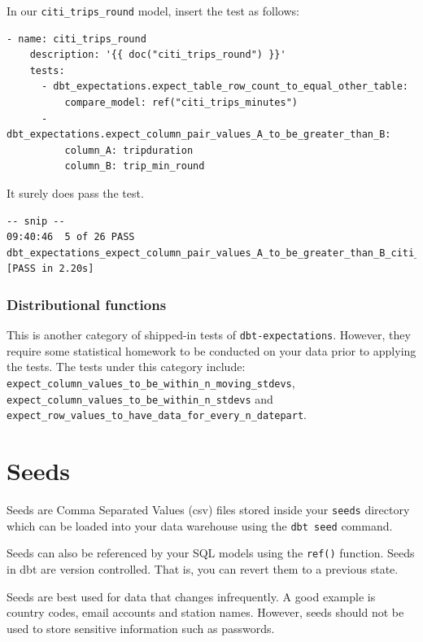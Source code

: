 \documentclass[
]{book}
\begin{document}
In our \texttt{citi\_trips\_round} model, insert the test as follows:

\begin{verbatim}
- name: citi_trips_round
    description: '{{ doc("citi_trips_round") }}'
    tests:
      - dbt_expectations.expect_table_row_count_to_equal_other_table:
          compare_model: ref("citi_trips_minutes")
      - dbt_expectations.expect_column_pair_values_A_to_be_greater_than_B:
          column_A: tripduration
          column_B: trip_min_round
\end{verbatim}

It surely does pass the test.

\begin{verbatim}
-- snip --
09:40:46  5 of 26 PASS dbt_expectations_expect_column_pair_values_A_to_be_greater_than_B_citi_trips_round_tripduration__trip_min_round  [PASS in 2.20s]
\end{verbatim}

\hypertarget{distributional-functions}{%
\subsection{Distributional functions}\label{distributional-functions}}

This is another category of shipped-in tests of \texttt{dbt-expectations}. However, they require some statistical homework to be conducted on your data prior to applying the tests. The tests under this category include: \texttt{expect\_column\_values\_to\_be\_within\_n\_moving\_stdevs}, \texttt{expect\_column\_values\_to\_be\_within\_n\_stdevs} and \texttt{expect\_row\_values\_to\_have\_data\_for\_every\_n\_datepart}.

\hypertarget{seeds}{%
\chapter{Seeds}\label{seeds}}

Seeds are Comma Separated Values (csv) files stored inside your \texttt{seeds} directory which can be loaded into your data warehouse using the \texttt{dbt\ seed} command.

Seeds can also be referenced by your SQL models using the \texttt{ref()} function. Seeds in dbt are version controlled. That is, you can revert them to a previous state.

Seeds are best used for data that changes infrequently. A good example is country codes, email accounts and station names. However, seeds should not be used to store sensitive information such as passwords.
\end{document}
